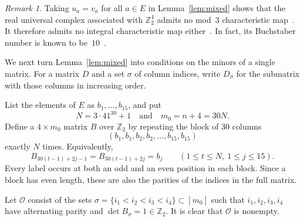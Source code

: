 \documentclass[10pt,a4paper]{amsart}
\theoremstyle{plain}
\numberwithin{equation}{section}
\theoremstyle{remark}
\newtheorem{remark}[theorem]{Remark}
\theoremstyle{definition}
\newcommand{\Z}{\mathbb Z}
\newcommand{\cO}{\mathcal O}
\newcommand{\wideand}{\quad \text{and} \quad}
\begin{document}
\begin{remark}
  Taking $u_a = v_a$ for all $a \in E$ in Lemma~\ref{lem:mixed} shows that the real universal complex associated with $\Z_2^4$ admits no mod~$3$ characteristic map~\cite{Baralic-Vavpetic-Vucic2024}.
  It therefore admits no integral characteristic map either~\cite{Ayzenberg2014preprint}.
  In fact, its Buchstaber number is known to be~$10$~\cite{Sun2017}.
\end{remark}

We next turn Lemma~\ref{lem:mixed} into conditions on the minors of a single matrix.
For a matrix $D$ and a set $\sigma$ of column indices, write $D_\sigma$ for the submatrix with those columns in increasing order.

List the elements of $E$ as $b_1,\ldots,b_{15}$, and put
\begin{equation}\label{eq:parameters}
    N=3\cdot41^{30}+1 \wideand m_0=n+4=30N.
\end{equation}
Define a $4\times m_0$ matrix $B$ over $\Z_2$ by repeating the block of $30$ columns
$$
    (b_1,b_1,b_2,b_2,\ldots,b_{15},b_{15})
$$
exactly $N$ times.
Equivalently,
\begin{equation}\label{eq:binary}
    B_{30(t-1)+2j-1}=B_{30(t-1)+2j}=b_j \qquad(1\le t\le N,\ 1\le j\le15).
\end{equation}
Every label occurs at both an odd and an even position in each block. Since a block has even length, these are also the parities of the indices in the full matrix.

Let $\cO$ consist of the sets $\sigma=\{i_1<i_2<i_3<i_4\}\subset[m_0]$ such that $i_1,i_2,i_3,i_4$ have alternating parity and $\det B_\sigma = 1 \in \Z_2$.
It is clear that $\cO$ is nonempty.
\end{document}
